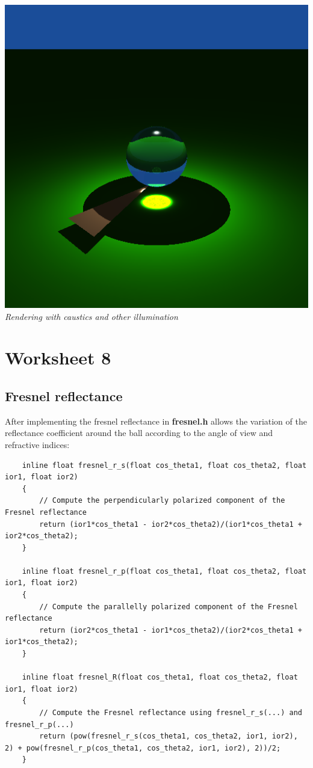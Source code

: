 \documentclass[a4,12pt]{article}
\begin{document}
\begin{center}
\begin{minipage}[b]{0.40\linewidth}
\begin{center}
				\includegraphics[width = \textwidth]{./Worksheet7/causticsandillumination.png}\\
				\textit{Rendering with caustics and other illumination}
			\end{center}
		\end{minipage}
	\end{center}
	
	\section{Worksheet 8}
	\subsection{Fresnel reflectance}
	After implementing the fresnel reflectance in \textbf{fresnel.h} allows the variation of the reflectance coefficient around the ball according to the angle of view and refractive indices:
	\begin{lstlisting}
	inline float fresnel_r_s(float cos_theta1, float cos_theta2, float ior1, float ior2)
	{
		// Compute the perpendicularly polarized component of the Fresnel reflectance
		return (ior1*cos_theta1 - ior2*cos_theta2)/(ior1*cos_theta1 + ior2*cos_theta2);
	}
	
	inline float fresnel_r_p(float cos_theta1, float cos_theta2, float ior1, float ior2)
	{
		// Compute the parallelly polarized component of the Fresnel reflectance
		return (ior2*cos_theta1 - ior1*cos_theta2)/(ior2*cos_theta1 + ior1*cos_theta2);
	}
	
	inline float fresnel_R(float cos_theta1, float cos_theta2, float ior1, float ior2)
	{
		// Compute the Fresnel reflectance using fresnel_r_s(...) and fresnel_r_p(...)
		return (pow(fresnel_r_s(cos_theta1, cos_theta2, ior1, ior2), 2) + pow(fresnel_r_p(cos_theta1, cos_theta2, ior1, ior2), 2))/2;
	}
	\end{lstlisting}
	
\end{document}
